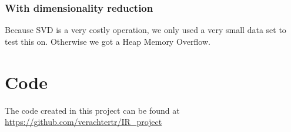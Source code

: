 \documentclass[10pt,a4paper]{paper}
\begin{document}
\subsubsection{With dimensionality reduction}
Because SVD is a very costly operation, we only used a very small data set to test this on. Otherwise we got a Heap Memory Overflow.

\section{Code}
The code created in this project can be found at \url{https://github.com/verachtertr/IR_project}
\end{document}
